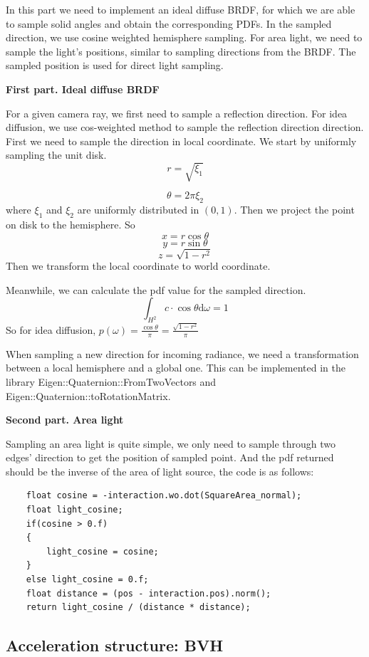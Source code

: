 \documentclass[acmtog]{acmart}
\begin{document}
In this part we need to implement an ideal diffuse BRDF, for which we are able to sample solid angles and obtain the corresponding PDFs. In the sampled direction, we use cosine weighted hemisphere sampling. For area
light, we need to sample the light's positions, similar to sampling directions from the BRDF. The sampled position is used for direct light sampling.

\textbf{First part. Ideal diffuse BRDF}

For a given camera ray, we first need to sample a reflection direction.
For idea diffusion, we use cos-weighted method to sample the reflection direction direction. First we need to sample the direction in local coordinate. We start by uniformly sampling the unit disk.
$$r = \sqrt{\xi_1}$$

$$\theta = 2\pi \xi_2$$
where $\xi_1$ and $\xi_2$ are uniformly distributed in $(0,1)$. Then we project the point on disk to the hemisphere. So
\[x = r \cos \theta\]
\[y = r \sin \theta\]
\[z = \sqrt{1 - r^2}\]
Then we transform the local coordinate to world coordinate. 

Meanwhile, we can calculate the pdf value for the sampled direction. 
$$\int_{H^2} c\cdot \cos \theta \mathrm{d}\omega = 1$$
So for idea diffusion, $p(\omega) = \frac{\cos \theta}{\pi} = \frac{\sqrt{1-r^2}}{\pi}$

When sampling a new direction for incoming radiance, we need a transformation between a local hemisphere and a global one. This can be implemented in the library Eigen::Quaternion::FromTwoVectors and Eigen::Quaternion::toRotationMatrix.

\textbf{Second part. Area light}

Sampling an area light is quite simple, we only need to sample through two edges' direction to get the position of sampled point. And the pdf returned should be the inverse of the area of light source, the code is as follows:

\begin{lstlisting}
	float cosine = -interaction.wo.dot(SquareArea_normal);
    float light_cosine;
    if(cosine > 0.f)
    {
        light_cosine = cosine;
    }
    else light_cosine = 0.f;
    float distance = (pos - interaction.pos).norm();
    return light_cosine / (distance * distance);
\end{lstlisting}

\subsection{Acceleration structure: BVH}
\end{document}
